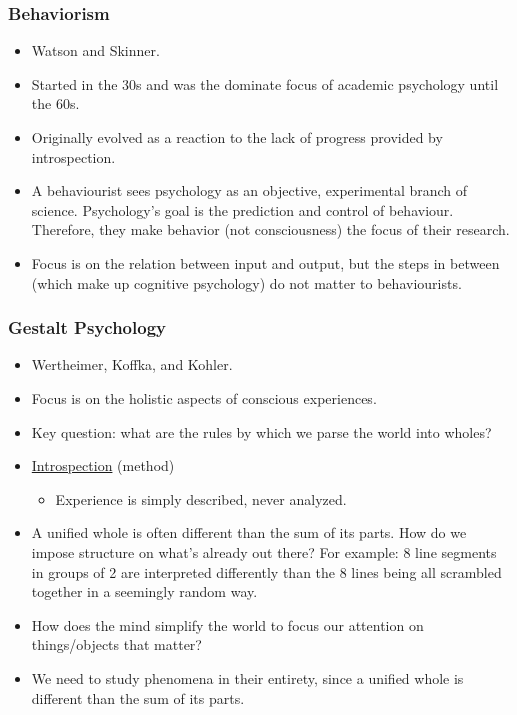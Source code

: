 \documentclass[]{article}
\begin{document}
			\subsubsection{Behaviorism}
				\begin{itemize}
					\item Watson and Skinner.
					\item Started in the 30s and was the dominate focus of academic psychology until the 60s.
					\item Originally evolved as a reaction to the lack of progress provided by introspection.
					\item A behaviourist sees psychology as an objective, experimental branch of science. Psychology's goal is the prediction and control of behaviour. Therefore, they make behavior (not consciousness) the focus of their research.
					\item Focus is on the relation between input and output, but the steps in between (which make up cognitive psychology) do not matter to behaviourists.
				\end{itemize}
				
			\subsubsection{Gestalt Psychology}
				\begin{itemize}
					\item Wertheimer, Koffka, and Kohler.
					\item Focus is on the holistic aspects of conscious experiences.
					\item Key question: what are the rules by which we parse the world into wholes?
					\item \underline{Introspection} (method)
						\begin{itemize}
							\item Experience is simply described, never analyzed.
						\end{itemize}
					\item A unified whole is often different than the sum of its parts. How do we impose structure on what's already out there? For example: 8 line segments in groups of 2 are interpreted differently than the 8 lines being all scrambled together in a seemingly random way.
					\item How does the mind simplify the world to focus our attention on things/objects that matter?
					\item We need to study phenomena in their entirety, since a unified whole is different than the sum of its parts.
				\end{itemize}
			
\end{document}
